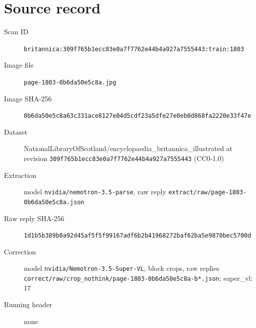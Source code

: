 \documentclass{article}
\begin{document}
\section*{Source record}
\begin{description}
\item[Scan ID] \texttt{britannica:309f765b1ecc83e0a7f7762e44b4a927a7555443:train:1803}
\item[Image file] \texttt{page-1803-0b6da50e5c8a.jpg}
\item[Image SHA-256] \texttt{0b6da50e5c8a63c331ace8127e04d5cdf23a5dfe27e0eb0d868fa2220e33f47e}
\item[Dataset] NationalLibraryOfScotland/encyclopaedia\_britannica\_illustrated at revision \texttt{309f765b1ecc83e0a7f7762e44b4a927a7555443} (CC0-1.0)
\item[Extraction] model \texttt{nvidia/nemotron-3.5-parse}, raw reply \texttt{extract/raw/page-1803-0b6da50e5c8a.json}
\item[Raw reply SHA-256] \texttt{1d1b5b389b0a92d45af5f5f99167adf6b2b41968272baf62ba5e9870bec5700d}
\item[Correction] model \texttt{nvidia/Nemotron-3.5-Super-VL}, block crops, raw replies \texttt{correct/raw/crop\_nothink/page-1803-0b6da50e5c8a-b*.json}; super\_vl: 17
\item[Running header] none
\end{description}
\end{document}
